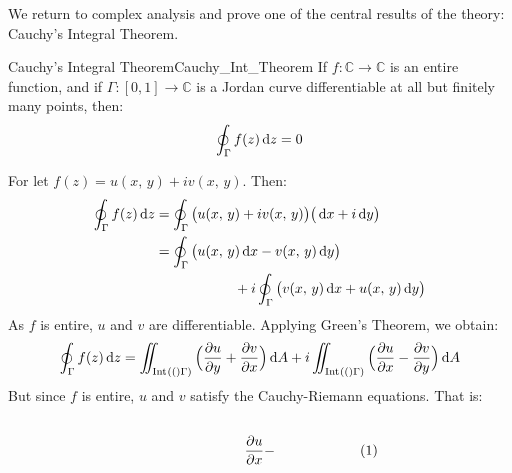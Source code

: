     We return to complex analysis and prove one of the central results of
    the theory: Cauchy's Integral Theorem.
    \newpage
    \begin{ftheorem}{Cauchy's Integral Theorem}{Cauchy_Int_Theorem}
        If $f:\mathbb{C}\rightarrow\mathbb{C}$ is an entire function, and
        if $\Gamma:[0,1]\rightarrow\mathbb{C}$ is a Jordan curve
        differentiable at all but finitely many points, then:
        \begin{equation}
            \oint_{\Gamma}f(z)\diff{z}=0
        \end{equation}
    \end{ftheorem}
    \begin{bproof}
        For let $f(z)=u(x,\,y)+iv(x,\,y)$. Then:
        \begin{subequations}
            \begin{align}
                \oint_{\Gamma}f(z)\diff{z}
                &=\oint_{\Gamma}\big(u(x,\,y)+iv(x,\,y)\big)
                    \big(\diff{x}+i\diff{y}\big)\\
                \nonumber&=\oint_{\Gamma}
                    \big(u(x,\,y)\diff{x}-v(x,\,y)\diff{y}\big)\\
                &\hspace{2cm}+i\oint_{\Gamma}
                    \big(v(x,\,y)\diff{x}+u(x,\,y)\diff{y}\big)
            \end{align}
        \end{subequations}
        As $f$ is entire, $u$ and $v$ are differentiable.
        Applying Green's Theorem, we obtain:
        \begin{equation}
            \oint_{\Gamma}f(z)\diff{z}
            =\iint_{\interior[](\Gamma)}
            \Big(\frac{\partial{u}}{\partial{y}}+
                 \frac{\partial{v}}{\partial{x}}\Big)
                 \diff{A}+
            i\iint_{\interior[](\Gamma)}
            \Big(\frac{\partial{u}}{\partial{x}}-
                 \frac{\partial{v}}{\partial{y}}\Big)\diff{A}
        \end{equation}
        But since $f$ is entire, $u$ and $v$ satisfy
        the Cauchy-Riemann equations. That is:
        \par\hfill\par
        \begin{subequations}
            \begin{minipage}{0.49\textwidth}
                \centering
                \begin{equation}
                    \frac{\partial{u}}{\partial{x}}-

\end{equation}
\end{minipage}
\end{subequations}
\end{bproof}
